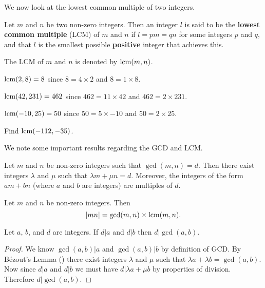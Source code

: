 We now look at the lowest common multiple of two integers.
\begin{definition}
    Let $m$ and $n$ be two non-zero integers. Then an integer $l$ is said to be the \textbf{lowest common multiple} (LCM) of $m$ and $n$ if $l = pm = qn$ for some integers $p$ and $q$, and that $l$ is the smallest possible \textbf{positive} integer that achieves this.

    The LCM of $m$ and $n$ is denoted by $\mathrm{lcm}(m,n)$.
\end{definition}

\begin{example}
    $\mathrm{lcm}(2, 8) = 8$ since $8 = 4 \times 2$ and $8 = 1 \times 8$.
\end{example}
\begin{example}
    $\mathrm{lcm}(42, 231) = 462$ since $462 = 11 \times 42$ and $462 = 2 \times 231$.
\end{example}
\begin{example}
    $\mathrm{lcm}(-10, 25) = 50$ since $50 = 5 \times -10$ and $50 = 2 \times 25$.
\end{example}
\begin{exercise}
    Find $\mathrm{lcm}(-112, -35)$.
\end{exercise}

We note some important results regarding the GCD and LCM.
\begin{lemma}[B\'{e}zout]\label{lemma-bezout}
    Let $m$ and $n$ be non-zero integers such that $\gcd(m, n) = d$. Then there exist integers $\lambda$ and $\mu$ such that $\lambda m + \mu n = d$. Moreover, the integers of the form $am + bn$ (where $a$ and $b$ are integers) are multiples of $d$.
\end{lemma}
\begin{proposition}\label{prop-product-of-gcd-and-lcm}
    Let $m$ and $n$ be non-zero integers. Then
    \[
        |mn| = \gcd(m,n) \times \mathrm{lcm}(m,n).
    \]
\end{proposition}
\begin{proposition}\label{prop-gcd-divides-common-divisor}
    Let $a$, $b$, and $d$ are integers. If $d \vert a$ and $d \vert b$ then $d \vert \gcd(a, b)$.
\end{proposition}
\begin{proof}
    We know $\gcd(a,b) \vert a$ and $\gcd(a,b) \vert b$ by definition of GCD. By B\'{e}zout's Lemma () there exist integers $\lambda$ and $\mu$ such that $\lambda a + \lambda b = \gcd(a,b)$. Now since $d \vert a$ and $d \vert b$ we must have $d \vert \lambda a + \mu b$ by properties of division. Therefore $d \vert \gcd(a,b)$.
\end{proof}

